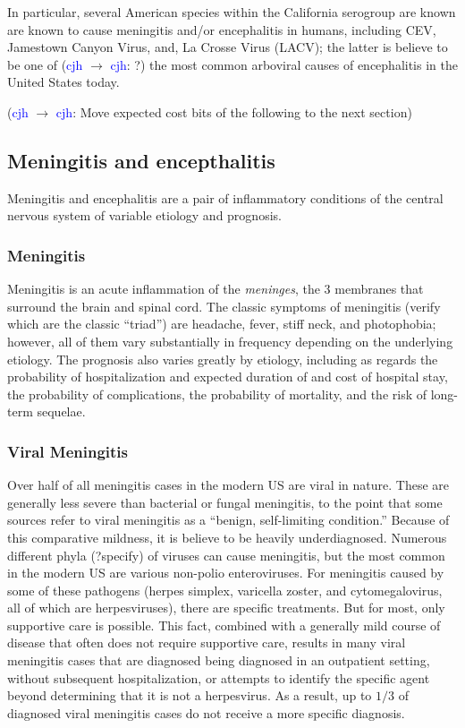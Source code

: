 \documentclass{article}
\newcommand{\cjh}{\textcolor{blue}{cjh}}
\newcommand{\msg}[3]{(#1 $\rightarrow$ #2: #3)}
\newcommand{\mcc}[1]{\msg\cjh\cjh{#1}}
\begin{document}
        In particular, several American species within the California serogroup are known are known to cause meningitis and/or encephalitis in humans, including CEV, Jamestown Canyon Virus, and, La Crosse Virus (LACV); the latter is believe to be one of \mcc{?} the most common arboviral causes of encephalitis in the United States today.


        \mcc{Move expected cost bits of the following to the next section}
        \subsection{Meningitis and encepthalitis}
            Meningitis and encephalitis are a pair of inflammatory conditions of the central nervous system of variable etiology and prognosis.
            
            \subsubsection{Meningitis}
            Meningitis is an acute inflammation of the \textit{meninges}, the 3 membranes that surround the brain and spinal cord. The classic symptoms of meningitis (verify which are the classic ``triad'') are headache, fever, stiff neck, and photophobia; however, all of them vary substantially in frequency depending on the underlying etiology. The prognosis also varies greatly by etiology, including as regards the probability of hospitalization and expected duration of and cost of hospital stay, the probability of complications, the probability of mortality, and the risk of long-term sequelae.

        \subsubsection{Viral Meningitis}
            Over half of all meningitis cases in the modern US are viral in nature. These are generally less severe than bacterial or fungal meningitis, to the point that some sources refer to viral meningitis as a ``benign, self-limiting condition.''\cite{asdf} Because of this comparative mildness, it is believe to be heavily underdiagnosed. Numerous different phyla (?specify) of viruses can cause meningitis, but the most common in the modern US are various non-polio enteroviruses. For meningitis caused by some of these pathogens (herpes simplex, varicella zoster, and cytomegalovirus, all of which are herpesviruses), there are specific treatments. But for most, only supportive care is possible. This fact, combined with a generally mild course of disease that often does not require supportive care, results in many viral meningitis cases that are diagnosed being diagnosed in an outpatient setting, without subsequent hospitalization, or attempts to identify the specific agent beyond determining that it is not a herpesvirus. As a result, up to $1/3$ of diagnosed viral meningitis cases do not receive a more specific diagnosis.
\end{document}
